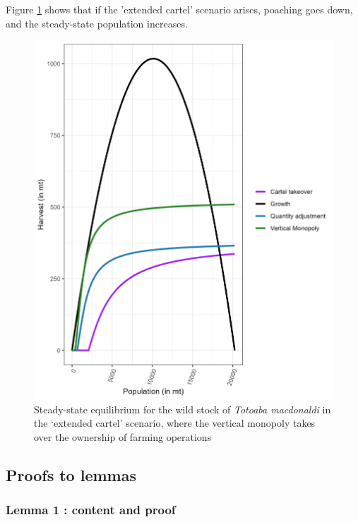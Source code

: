 Figure \ref{fig:extended_cartel} shows that if the 'extended cartel' scenario arises, poaching goes down, and the steady-state population increases.
\clearpage

\begin{figure}
    \centering
    \includegraphics[width = .7\textwidth]{figures/totoaba/sup_figure2.png}
    \caption{ Steady-state equilibrium for the wild stock of \textit{Totoaba macdonaldi }in the ‘extended cartel’ scenario, where the vertical monopoly takes over the ownership of farming operations}
    \label{fig:extended_cartel}
\end{figure}

\subsection{Proofs to lemmas}
\label{subsection:appendix_toto}
\subsubsection{Lemma 1 : content and proof}
\label{section:AppendixB}

